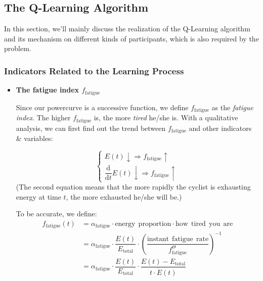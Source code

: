 \documentclass{article}
\begin{document}
		\subsection{The Q-Learning Algorithm}
			In this section, we'll mainly discuss the realization of the Q-Learning algorithm and its mechanism on different kinds of participants, which is also required by the problem.

			\subsubsection{Indicators Related to the Learning Process}
				\begin{itemize}
					\item \textbf{The fatigue index \(f_{\mathrm{fatigue}}\)}

						Since our powercurve is a successive function, we define \(f_{\mathrm{fatigue}}\) as the \textit{fatigue index}. The higher \(f_{\mathrm{fatigue}}\) is, the more \textit{tired} he/she is. With a qualitative analysis, we can first find out the trend between \(f_{\mathrm{fatigue}}\) and other indicators \& variables:

						\[
							\begin{cases}
								E(t)\downarrow\Rightarrow f_{\mathrm{fatigue}}\uparrow \\
								\dfrac{\mathrm{d}}{\mathrm{d}t}E(t)\downarrow\Rightarrow f_{\mathrm{fatigue}}\uparrow
							\end{cases}
						\]
						(The second equation means that the more rapidly the cyclist is exhausting energy at time \(t\), the more exhausted he/she will be.)

						To be accurate, we define:
						\[
							\begin{aligned}
								f_{\mathrm{fatigue}}\left( t \right) &=\alpha _{\mathrm{fatigue}}\cdot \mathrm{energy}\:\:\mathrm{proportion}\cdot \mathrm{how}\:\:\mathrm{tired}\:\:\mathrm{you}\:\:\mathrm{are}
								\\
								&=\alpha _{\mathrm{fatigue}}\cdot \dfrac{E\left( t \right)}{E_{\mathrm{total}}}\cdot \left( \dfrac{\mathrm{instant}\:\:\mathrm{fatigue}\:\:\mathrm{rate}}{f_{\mathrm{fatigue}}^{\Theta}} \right) ^{-1}
								\\
								&=\alpha _{\mathrm{fatigue}}\cdot \dfrac{E\left( t \right)}{E_{\mathrm{total}}}\cdot \dfrac{E\left( t \right) -E_{\mathrm{total}}}{t\cdot \dot{E}\left( t \right)}
							\end{aligned}
						\]


\end{itemize}
\end{document}
